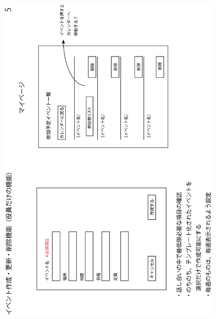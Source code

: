 \begin{figure}[ht]
    \begin{center}
      \includegraphics[keepaspectratio, scale=0.8]{appendixs/appendixA_figres/fig5.png}
    \end{center}
\end{figure}
